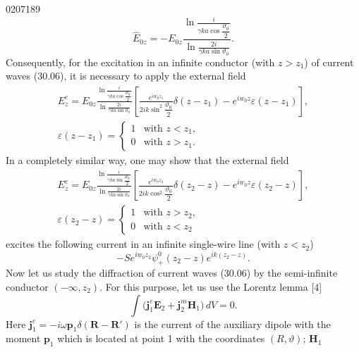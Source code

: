 \begin{scanpage}{0207}{189}
\[
\hat E_{0z}=-E_{0z}\frac{\displaystyle\ln\frac{i}{\gamma ka\cos\dfrac{\vartheta_0}2}}{\displaystyle\ln\frac{2i}{\gamma ka\sin\vartheta_0}}.\tag{30.15}
\]
Consequently, for the excitation in an infinite conductor (with $z>z_1$) of current waves (30.06), it is necessary to apply the external field
\[
\begin{gathered}
E_z^e=E_{0z}\frac{\displaystyle\ln\frac{i}{\gamma ka\cos\dfrac{\vartheta_0}2}}{\displaystyle\ln\frac{2i}{\gamma ka\sin\vartheta_0}}
\left[\frac{e^{iw_0z_1}}{2ik\sin^2\dfrac{\vartheta_0}2}\delta(z-z_1)-e^{iw_0z}\varepsilon(z-z_1)\right],\\
\varepsilon(z-z_1)=\begin{cases}1&\text{with }z<z_1,\\0&\text{with }z>z_1.\end{cases}
\end{gathered}\tag{30.16}
\]
In a completely similar way, one may show that the external field
\[
\begin{gathered}
E_z^e=E_{0z}\frac{\displaystyle\ln\frac{i}{\gamma ka\sin\dfrac{\vartheta_0}2}}{\displaystyle\ln\frac{2i}{\gamma ka\sin\vartheta_0}}
\left[\frac{e^{iw_0z_2}}{2ik\cos^2\dfrac{\vartheta_0}2}\delta(z_2-z)-e^{iw_0z}\varepsilon(z_2-z)\right],\\
\varepsilon(z_2-z)=\begin{cases}1&\text{with }z>z_2,\\0&\text{with }z<z_2\end{cases}
\end{gathered}\tag{30.17}
\]
excites the following current in an infinite single-wire line (with $z<z_2$)
\[-Se^{iw_0z_2}\psi_+^0(z_2-z)e^{ik(z_2-z)}.\tag{30.18}\]
Now let us study the diffraction of current waves (30.06) by the semi-infinite conductor $(-\infty,z_2)$. For this purpose, let us use the Lorentz lemma [4]
\[\int\bigl(\mathbf j_1^e\mathbf E_2+\mathbf j_2^m\mathbf H_1\bigr)\,dV=0.\tag{30.19}\]
Here $\mathbf j_1^e=-i\omega\mathbf p_1\delta(\mathbf R-\mathbf R')$ is the current of the auxiliary dipole with the moment $\mathbf p_1$ which is located at point 1 with the coordinates $(R,\vartheta)$; $\mathbf H_1$
\end{scanpage}
